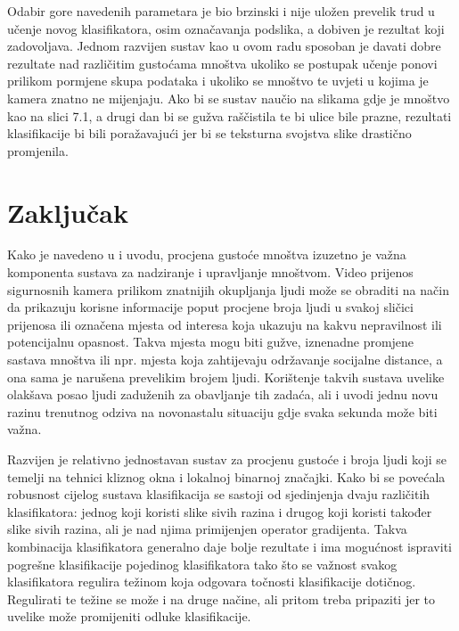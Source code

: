 \documentclass[times, utf8, zavrsni]{fer}
\begin{document}
\bigbreak

Odabir gore navedenih parametara je bio brzinski i nije uložen prevelik trud u učenje novog 
klasifikatora, osim označavanja podslika, a dobiven je rezultat koji zadovoljava. Jednom razvijen
sustav kao u ovom radu sposoban je davati dobre rezultate nad različitim gustoćama mnoštva
ukoliko se postupak učenje ponovi prilikom pormjene skupa podataka i ukoliko se mnoštvo te uvjeti
u kojima je kamera znatno ne mijenjaju. Ako bi se sustav naučio na slikama gdje je mnoštvo kao na
slici 7.1, a drugi dan bi se gužva raščistila te bi ulice bile prazne, rezultati klasifikacije bi bili poražavajući
jer bi se teksturna svojstva slike drastično promjenila.























\chapter{Zaključak}

Kako je navedeno u i uvodu, procjena gustoće mnoštva izuzetno je važna komponenta sustava
za nadziranje i upravljanje mnoštvom. Video prijenos sigurnosnih kamera prilikom znatnijih 
okupljanja ljudi može se obraditi na način da prikazuju korisne informacije poput procjene
broja ljudi u svakoj sličici prijenosa ili označena mjesta od interesa koja ukazuju na kakvu 
nepravilnost ili potencijalnu opasnost. Takva mjesta mogu biti gužve, iznenadne promjene
sastava mnoštva ili npr. mjesta koja zahtijevaju održavanje socijalne distance, a ona sama
je narušena prevelikim brojem ljudi. Korištenje takvih sustava uvelike olakšava posao ljudi
zaduženih za obavljanje tih zadaća, ali i uvodi jednu novu razinu trenutnog odziva na novonastalu 
situaciju gdje svaka sekunda može biti važna. 

\bigbreak

Razvijen je relativno jednostavan sustav za procjenu gustoće i broja ljudi koji se temelji na 
tehnici kliznog okna i lokalnoj binarnoj značajki. Kako bi se povećala robusnost cijelog sustava
klasifikacija se sastoji od sjedinjenja dvaju različitih klasifikatora: jednog koji koristi slike
sivih razina i drugog koji koristi također slike sivih razina, ali je nad njima primijenjen operator 
gradijenta. Takva kombinacija klasifikatora generalno daje bolje rezultate i ima mogućnost
ispraviti pogrešne klasifikacije pojedinog klasifikatora tako što se važnost svakog klasifikatora
regulira težinom koja odgovara točnosti klasifikacije dotičnog. Regulirati te težine se može i 
na druge načine, ali pritom treba pripaziti jer to uvelike može promijeniti odluke klasifikacije.
\end{document}
